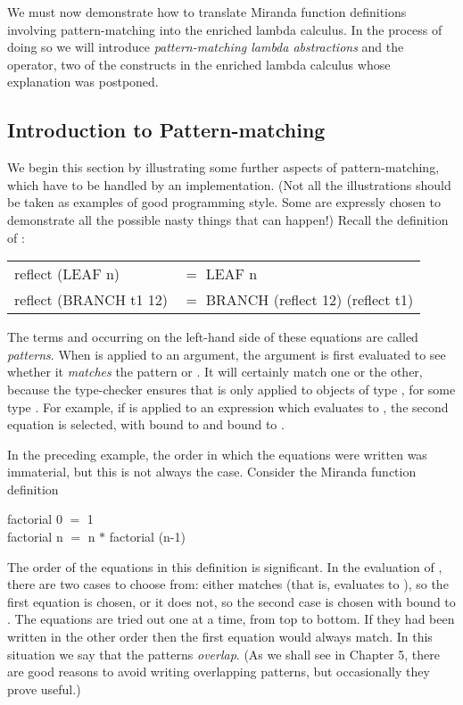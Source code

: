 We must now demonstrate how to translate Miranda function definitions involving pattern-matching into the enriched lambda calculus. In the process of doing so we will introduce \textit{pattern-matching lambda abstractions} and the \fatbar{} operator, two of the constructs in the enriched lambda calculus whose explanation was postponed.

\subsection{Introduction to Pattern-matching}
We begin this section by illustrating some further aspects of pattern-matching, which have to be handled by an implementation. (Not all the illustrations should be taken as examples of good programming style. Some are expressly chosen to demonstrate all the possible nasty things that can happen!)  Recall the definition of :
\begin{mlcoded}
    \begin{tabular}{ll}
    reflect (LEAF n) &$=$ LEAF n\\
    reflect (BRANCH t1 12) &$=$ BRANCH (reflect 12) (reflect t1)
    \end{tabular}
\end{mlcoded}

The terms  and  occurring on the left-hand side of these equations are called \textit{patterns}. When  is applied to an argument, the argument is first evaluated to see whether it \textit{matches} the pattern  or . It will certainly match one or the other, because the type-checker ensures that  is only applied to objects of type , for some type \ml{$*$}. For example, if  is applied to an expression which evaluates to , the second equation is selected, with  bound to  and  bound to .

In the preceding example, the order in which the equations were written was immaterial, but this is not always the case. Consider the Miranda function definition
\begin{mlcoded}
    factorial 0 $=$ 1\\
    factorial n $=$ n $*$ factorial (n-1)
\end{mlcoded}

The order of the equations in this definition is significant. In the evaluation of , there are two cases to choose from: either  matches  (that is,  evaluates to ), so the first equation is chosen, or it does not, so the second case is chosen with  bound to . The equations are tried out one at a time, from top to bottom. If they had been written in the other order then the first equation would always match. In this situation we say that the patterns \textit{overlap}. (As we shall see in Chapter 5, there are good reasons to avoid writing overlapping patterns, but occasionally they prove useful.)

